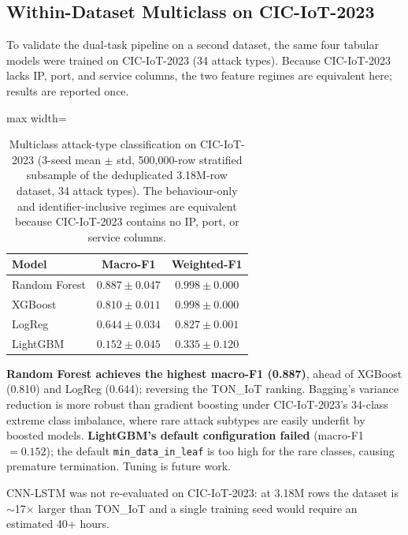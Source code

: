 \documentclass[12pt,a4paper]{report}
\begin{document}
\subsection{Within-Dataset Multiclass on CIC-IoT-2023}
\label{sec:cic-multiclass}

To validate the dual-task pipeline on a second dataset, the same four tabular models were trained on CIC-IoT-2023 (34 attack types). Because CIC-IoT-2023 lacks IP, port, and service columns, the two feature regimes are equivalent here; results are reported once.

\begin{table}[H]
\centering
\caption{Multiclass attack-type classification on CIC-IoT-2023 (3-seed mean $\pm$ std, 500{,}000-row stratified subsample of the deduplicated 3.18M-row dataset, 34 attack types). The behaviour-only and identifier-inclusive regimes are equivalent because CIC-IoT-2023 contains no IP, port, or service columns.}
\label{tab:multiclass-cic}
\begin{adjustbox}{max width=\textwidth}
\begin{tabular}{lcc}
\toprule
\textbf{Model} & \textbf{Macro-F1} & \textbf{Weighted-F1} \\
\midrule
Random Forest & $\mathbf{0.887 \pm 0.047}$ & $0.998 \pm 0.000$ \\
XGBoost & $0.810 \pm 0.011$ & $0.998 \pm 0.000$ \\
LogReg & $0.644 \pm 0.034$ & $0.827 \pm 0.001$ \\
LightGBM & $0.152 \pm 0.045$ & $0.335 \pm 0.120$ \\
\bottomrule
\end{tabular}
\end{adjustbox}
\end{table}

\textbf{Random Forest achieves the highest macro-F1 (0.887)}, ahead of XGBoost (0.810) and LogReg (0.644); reversing the TON\_IoT ranking. Bagging's variance reduction is more robust than gradient boosting under CIC-IoT-2023's 34-class extreme class imbalance, where rare attack subtypes are easily underfit by boosted models. \textbf{LightGBM's default configuration failed} (macro-F1 $= 0.152$); the default \texttt{min\_data\_in\_leaf} is too high for the rare classes, causing premature termination. Tuning is future work.

CNN-LSTM was not re-evaluated on CIC-IoT-2023: at 3.18M rows the dataset is $\sim$17$\times$ larger than TON\_IoT and a single training seed would require an estimated 40+ hours.
\end{document}
